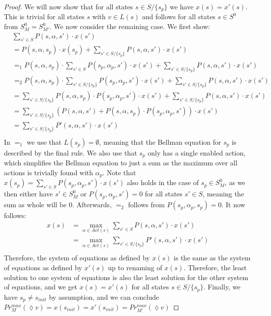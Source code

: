 \begin{proof}
	We will now show that for all states $s \in S/ \{s_p\}$ we have $x(s) = x'(s)$.
	This is trivial for all states $s$ with $v \in L(s)$ and follows for all states $s\in S^0$ from $S^0_M = S^0_{M'}$.
	We now consider the remaining case. We first show:
	\begin{align*}
		&\sum\limits_{s' \in S} P(s, \alpha, s') \cdot x(s') \\
		&= P(s, \alpha, s_p) \cdot x(s_p) + \sum\limits_{s' \in S/\{s_p\}} P(s, \alpha, s') \cdot x(s') \\
		&=_1 P(s, \alpha, s_p) \cdot \sum\limits_{s' \in S} P(s_p, \alpha_p, s') \cdot x(s') + \sum\limits_{s' \in S/\{s_p\}} P(s, \alpha, s') \cdot x(s') \\
		&=_2 P(s, \alpha, s_p) \cdot \sum\limits_{s' \in S/\{s_p\}} P(s_p, \alpha_p, s') \cdot x(s') + \sum\limits_{s' \in S/\{s_p\}} P(s, \alpha, s') \cdot x(s') \\
		&= \sum\limits_{s' \in S/\{s_p\}} P(s, \alpha, s_p) \cdot P(s_p, \alpha_p, s') \cdot x(s') + \sum\limits_{s' \in S/\{s_p\}} P(s, \alpha, s') \cdot x(s') \\
		&= \sum\limits_{s' \in S/\{s_p\}} \left(P(s, \alpha, s') + P(s, \alpha, s_p) \cdot P(s_p, \alpha_p, s')\right) \cdot x(s') \\
		&= \sum\limits_{s' \in S/\{s_p\}} P'(s, \alpha, s') \cdot x(s') \\
	\end{align*}
	In $=_1$ we use that $L(s_p) = \emptyset$, meaning that the Bellman equation for $s_p$ is described by the final rule.
	We also use that $s_p$ only has a single enabled action, which simplifies the Bellman equation to just a sum as the maximum over all actions is trivially found with $\alpha_p$.
	Note that $x(s_p) = \sum_{s' \in S} P(s_p, \alpha_p, s') \cdot x(s')$ also holds in the case of $s_p \in S^0_M$, as we then either have $s' \in S^0_M$ or $P(s_p, \alpha_p, s') = 0$ for all states $s' \in S$, meaning the sum as whole will be $0$.
	Afterwards, $=_2$ follows from $P(s_p, \alpha_p, s_p) = 0$.
	It now follows:
	\begin{align*}
		x(s) & = \max\limits_{\alpha \in \mathit{Act(s)}} \sum\limits_{s' \in S} P(s, \alpha, s') \cdot x(s') \\
		&= \max\limits_{\alpha \in \mathit{Act(s)}} \sum\limits_{s' \in S/\{s_p\}} P'(s, \alpha, s') \cdot x(s') \\
	\end{align*}
	Therefore, the system of equations as defined by $x(s)$ is the same as the system of equations as defined by $x'(s)$ up to renaming of $x(s)$. 
	Therefore, the least solution to one system of equations is also the least solution for the other system of equations, and we get $x(s) = x'(s)$ for all states $s \in S/\{s_p\}$.
	Finally, we have $s_p \neq s_{init}$ by assumption, and we can conclude $Pr^{max}_{M}(\lozenge v) = x(s_{init}) = x'(s_{init}) = Pr^{max}_{M'}(\lozenge v)$
\end{proof}



